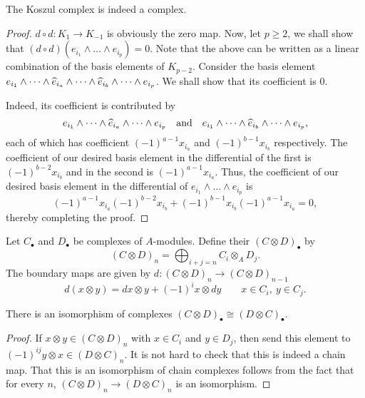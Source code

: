 \begin{proposition}
    The Koszul complex is indeed a complex.
\end{proposition}
\begin{proof}
    $d\circ d: K_1\to K_{- 1}$ is obviously the zero map. Now, let $p\ge 2$, we shall show that $(d\circ d)(e_{i_1}\wedge\dots\wedge e_{i_p}) = 0$. Note that the above can be written as a linear combination of the basis elements of $K_{p - 2}$. Consider the basis element $e_{i_1}\wedge\dots\wedge\widehat{e}_{i_a}\wedge\dots\wedge\widehat{e}_{i_b}\wedge\dots\wedge e_{i_p}$. We shall show that its coefficient is $0$.

    Indeed, its coefficient is contributed by 
    \begin{equation*}
    e_{i_1}\wedge\dots\wedge\widehat{e}_{i_a}\wedge\dots\wedge e_{i_p}\quad\text{and}\quad e_{i_1}\wedge\dots\wedge\widehat{e}_{i_b}\wedge\dots\wedge e_{i_p},
    \end{equation*}
    each of which has coefficient $(-1)^{a - 1}x_{i_a}$ and $(-1)^{b - 1} x_{i_b}$ respectively. The coefficient of our desired basis element in the differential of the first is $(-1)^{b - 2}x_{i_b}$ and in the second is $(-1)^{a - 1}x_{i_a}$. Thus, the coefficient of our desired basis element in the differential of $e_{i_1}\wedge\dots\wedge e_{i_p}$ is 
    \begin{equation*}
        (-1)^{a - 1}x_{i_a}(-1)^{b - 2}x_{i_b} + (-1)^{b - 1}x_{i_b}(-1)^{a - 1}x_{i_a} = 0,
    \end{equation*}
    thereby completing the proof.
\end{proof}

\begin{definition}
    Let $C_\bullet$ and $D_\bullet$ be complexes of $A$-modules. Define their  $(C\otimes D)_\bullet$ by 
    \begin{equation*}
        (C\otimes D)_n = \bigoplus_{i + j = n} C_i\otimes_A D_j.
    \end{equation*}
    The boundary maps are given by $d: (C\otimes D)_n\to (C\otimes D)_{n - 1}$ 
    \begin{equation*}
        d(x\otimes y) = dx\otimes y + (-1)^i x\otimes dy\qquad x\in C_i,~y\in C_j.
    \end{equation*}
\end{definition}

\begin{proposition}
    There is an isomorphism of complexes $(C\otimes D)_\bullet \cong (D\otimes C)_\bullet$.
\end{proposition}
\begin{proof}
    If $x\otimes y\in (C\otimes D)_n$ with $x\in C_i$ and $y\in D_j$, then send this element to $(-1)^{ij}y\otimes x\in (D\otimes C)_n$. It is not hard to check that this is indeed a chain map. That this is an isomorphism of chain complexes follows from the fact that for every $n$, $(C\otimes D)_n\to (D\otimes C)_n$ is an isomorphism.
\end{proof}

